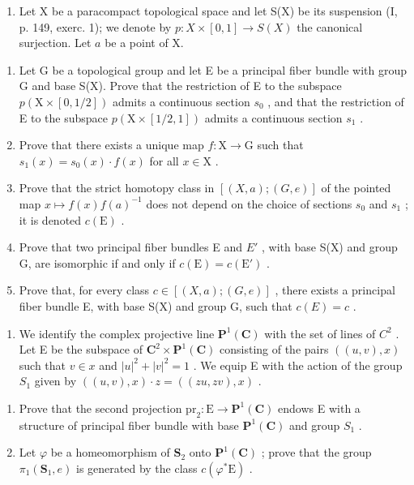 \begin{enumerate}
\def\labelenumi{\arabic{enumi})}
\setcounter{enumi}{7}
\tightlist
\item
  Let X be a paracompact topological space and let S(X) be its suspension (I, p. 149, exerc. 1); we denote by \(p\colon X \times [0,1] \to S(X)\) the canonical surjection. Let \(a\) be a point of X.
\end{enumerate}

\begin{enumerate}
\def\labelenumi{\alph{enumi})}
\item
  Let G be a topological group and let E be a principal fiber bundle with group G and base S(X). Prove that the restriction of E to the subspace \(p(\mathrm{X} \times [0,1/2])\) admits a continuous section \(s_{0}\) , and that the restriction of E to the subspace \(p(\mathrm{X} \times [1/2,1])\) admits a continuous section \(s_{1}\) .
\item
  Prove that there exists a unique map \(f\colon \mathrm{X}\to \mathrm{G}\) such that \(s_1(x) = s_0(x)\cdot f(x)\) for all \(x\in \mathrm{X}\) .
\item
  Prove that the strict homotopy class in \([(X,a);(G,e)]\) of the pointed map \(x \mapsto f(x)f(a)^{-1}\) does not depend on the choice of sections \(s_{0}\) and \(s_{1}\) ; it is denoted \(c(\mathrm{E})\) .
\item
  Prove that two principal fiber bundles E and \(E'\) , with base S(X) and group G, are isomorphic if and only if \(c(\mathrm{E}) = c(\mathrm{E}')\) .
\item
  Prove that, for every class \(c \in [(X, a); (G, e)]\) , there exists a principal fiber bundle E, with base S(X) and group G, such that \(c(E) = c\) .
\end{enumerate}

\begin{enumerate}
\def\labelenumi{\arabic{enumi})}
\setcounter{enumi}{8}
\tightlist
\item
  We identify the complex projective line \(\mathbf{P}^{1}(\mathbf{C})\) with the set of lines of \(C^{2}\) . Let E be the subspace of \(\mathbf{C}^{2} \times \mathbf{P}^{1}(\mathbf{C})\) consisting of the pairs \(((u, v), x)\) such that \(v \in x\) and \(|u|^{2} + |v|^{2} = 1\) . We equip E with the action of the group \(S_{1}\) given by \(((u, v), x) \cdot z = ((zu, zv), x)\) .
\end{enumerate}

\begin{enumerate}
\def\labelenumi{\alph{enumi})}
\item
  Prove that the second projection \(\mathrm{pr}_{2}\colon\mathrm{E}\to\mathbf{P}^{1}(\mathbf{C})\) endows E with a structure of principal fiber bundle with base \(\mathbf{P}^{1}(\mathbf{C})\) and group \(S_{1}\) .
\item
  Let \(\varphi\) be a homeomorphism of \(\mathbf{S}_2\) onto \(\mathbf{P}^1 (\mathbf{C})\) ; prove that the group \(\pi_1(\mathbf{S}_1,e)\) is generated by the class \(c(\varphi^{*}\mathrm{E})\) .
\end{enumerate}

\backmatter

